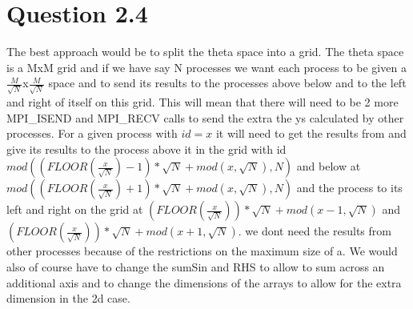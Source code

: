 \documentclass{article}
\begin{document}
\section*{Question 2.4}
The best approach would be to split the theta space into a grid. The theta
space is a MxM grid and if we have say N processes we want each process to be given
a $\frac{M}{\sqrt{N}}$x$\frac{M}{\sqrt{N}}$ space and to send its results to the processes
above below and to the left and right of itself on this grid. This will mean that
there will need to be 2 more MPI\_ISEND and MPI\_RECV calls to send the extra the ys calculated
by other processes. For a given process with $id=x$ it will need to get 
the results from and give its results to the process above it in the grid with id $mod((FLOOR(\frac{x}{\sqrt{N}})-1)*\sqrt{N}+mod(x,\sqrt{N}),N)$
and below at $mod((FLOOR(\frac{x}{\sqrt{N}})+1)*\sqrt{N}+mod(x,\sqrt{N}),N)$ and the process to its left and right on the grid
at $(FLOOR(\frac{x}{\sqrt{N}}))*\sqrt{N}+mod(x-1,\sqrt{N})$ and $(FLOOR(\frac{x}{\sqrt{N}}))*\sqrt{N}+mod(x+1,\sqrt{N})$.
we dont need the results from other processes because of the restrictions on the maximum
size of a. We would also of course have to change the sumSin and RHS to allow to sum across an additional axis and to change
the dimensions of the arrays to allow for the extra dimension in the 2d case.




\end{document}
